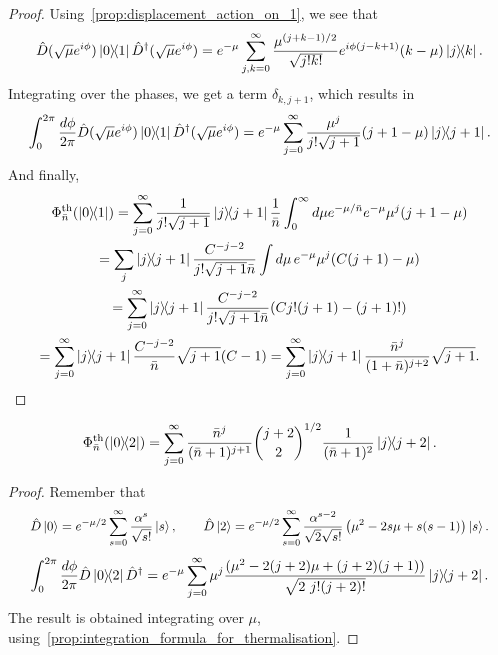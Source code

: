 \documentclass[12pt]{report}
\begin{document}
\begin{proof}
	Using~\cref{prop:displacement_action_on_1}, we see that
	\begin{equation}
		\hat D(\sqrt\mu e^{i\phi})\ketbra{0}{1} \hat D^\dagger(\sqrt\mu e^{i\phi})
		= e^{-\mu} \sum_{j,k=0}^\infty
		\frac{\mu^{(j+k-1)/2}}{\sqrt{j!k!}}
		e^{i\phi(j-k+1)} (k-\mu) \ketbra{j}{k}.
	\end{equation}
	Integrating over the phases, we get a term $\delta_{k,j+1}$, which results in
	\begin{equation}
		\int_0^{2\pi} \frac{d\phi}{2\pi}
		\hat D(\sqrt\mu e^{i\phi})\ketbra{0}{1} \hat D^\dagger(\sqrt\mu e^{i\phi})
		= e^{-\mu} \sum_{j=0}^\infty
		\frac{\mu^j}{j!\sqrt{j+1}} (j+1-\mu) \ketbra{j}{j+1}.
	\end{equation}
	And finally,
	\begin{equation}
	\begin{gathered}
		\Phi^{\rm th}_{\bar n}(\ketbra{0}{1})
		= \sum_{j=0}^\infty \frac{1}{j!\sqrt{j+1}} \ketbra{j}{j+1} \frac{1}{\bar n}
		\int_0^\infty d\mu
		e^{-\mu/\bar n} e^{-\mu} \mu^j (j+1-\mu) \\
		= \sum_j \ketbra{j}{j+1} \frac{C^{-j-2}}{j!\sqrt{j+1}\bar n}
		\int d\mu \, e^{-\mu} \mu^j (C(j+1) - \mu) \\
		= \sum_{j=0}^\infty \ketbra{j}{j+1} \frac{C^{-j-2}}{j!\sqrt{j+1}\bar n}
		(C j! (j+1) - (j+1)!) \\
		= \sum_{j=0}^\infty \ketbra{j}{j+1} \frac{C^{-j-2}}{\bar n} \sqrt{j+1} (C-1)
		= \sum_{j=0}^\infty \ketbra{j}{j+1}
			\frac{\bar n^{j}}{(1+\bar n)^{j+2}} \sqrt{j+1}.
	\end{gathered}
	\end{equation}
\end{proof}

\begin{prop}\label{prop:thermalisation_applied_to_02}
	\begin{equation}
		\Phi_{\bar n}^{\rm th}(\ketbra{0}{2})
		= \sum_{j=0}^\infty
		\frac{\bar n^j}{(\bar n + 1)^{j+1}}
		\binom{j+2}{2}^{1/2}
		\frac{1}{(\bar n + 1)^2}
		\ketbra{j}{j+2}.
	\end{equation}
\end{prop}
\begin{proof}
	Remember that
	\begin{equation}\scalebox{0.92}{$\displaystyle
		\hat D\ket0 = e^{-\mu/2} \sum_{s=0}^\infty \frac{\alpha^s}{\sqrt{s!}} \ket s,
		\qquad
		\hat D\ket2 = e^{-\mu/2} \sum_{s=0}^\infty \frac{\alpha^{s-2}}{\sqrt2\sqrt{s!}}
		\left(\mu^2 - 2s \mu + s(s-1)\right) \ket s.
	$}\end{equation}
	\begin{equation}
	\begin{gathered}
		\int_0^{2\pi} \frac{d\phi}{2\pi}
		\hat D \ketbra{0}{2} \hat D^\dagger
		= e^{-\mu} \sum_{j=0}^\infty
		\mu^j\frac{(\mu^2 - 2 (j+2) \mu + (j+2)(j+1))}{\sqrt{2\,\,j!(j+2)!}}
		\ketbra{j}{j+2}.
	\end{gathered}
	\end{equation}
	The result is obtained integrating over $\mu$, using~\cref{prop:integration_formula_for_thermalisation}.
\end{proof}
\end{document}
